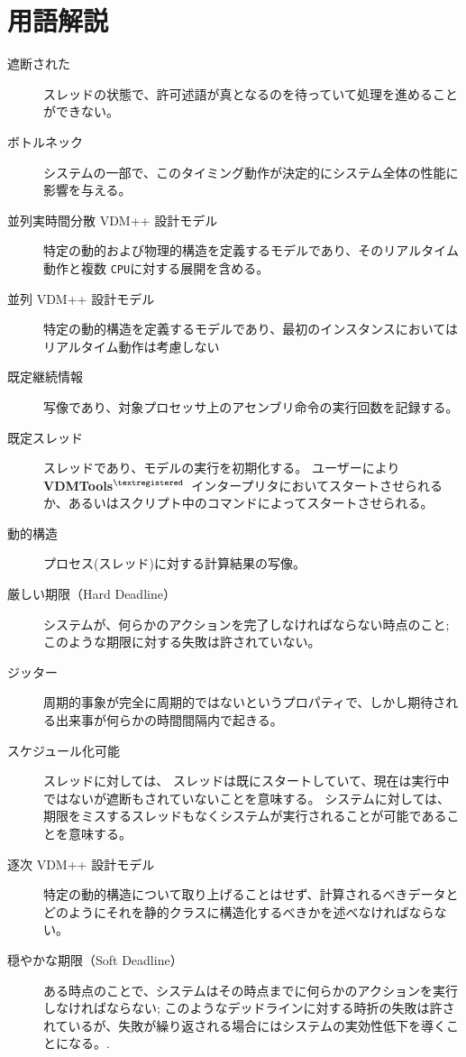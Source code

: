\documentclass[\pformat,12pt]{jreport}
\newcommand{\vdmtools}{\textbf{VDMTools}$^{\mathbf{{\textregistered}}}$}
\begin{document}




\newpage
\appendix

\chapter{用語解説}\label{app:glossary}

\begin{description}
\item[遮断された] スレッドの状態で、許可述語が真となるのを待っていて処理を進めることができない。
\item[ボトルネック] システムの一部で、このタイミング動作が決定的にシステム全体の性能に影響を与える。
\item[並列実時間分散 VDM++ 設計モデル] 特定の動的および物理的構造を定義するモデルであり、そのリアルタイム動作と複数 \texttt{CPU}に対する展開を含める。
\item[並列 VDM++ 設計モデル] 特定の動的構造を定義するモデルであり、最初のインスタンスにおいてはリアルタイム動作は考慮しない
\item[既定継続情報] 写像であり、対象プロセッサ上のアセンブリ命令の実行回数を記録する。
\item[既定スレッド] スレッドであり、モデルの実行を初期化する。
ユーザーにより \vdmtools\ インタープリタにおいてスタートさせられるか、あるいはスクリプト中のコマンドによってスタートさせられる。
\item[動的構造] プロセス(スレッド)に対する計算結果の写像。
\item[厳しい期限（Hard Deadline）] システムが、何らかのアクションを完了しなければならない時点のこと; このような期限に対する失敗は許されていない。
\item[ジッター] 周期的事象が完全に周期的ではないというプロパティで、しかし期待される出来事が何らかの時間間隔内で起きる。
\item[スケジュール化可能] スレッドに対しては、 スレッドは既にスタートしていて、現在は実行中ではないが遮断もされていないことを意味する。
システムに対しては、期限をミスするスレッドもなくシステムが実行されることが可能であることを意味する。
\item[逐次 VDM++ 設計モデル] 特定の動的構造について取り上げることはせず、計算されるべきデータとどのようにそれを静的クラスに構造化するべきかを述べなければならない。
\item[穏やかな期限（Soft Deadline）] ある時点のことで、システムはその時点までに何らかのアクションを実行しなければならない; このようなデッドラインに対する時折の失敗は許されているが、失敗が繰り返される場合にはシステムの実効性低下を導くことになる。.

\end{description}
\end{document}
